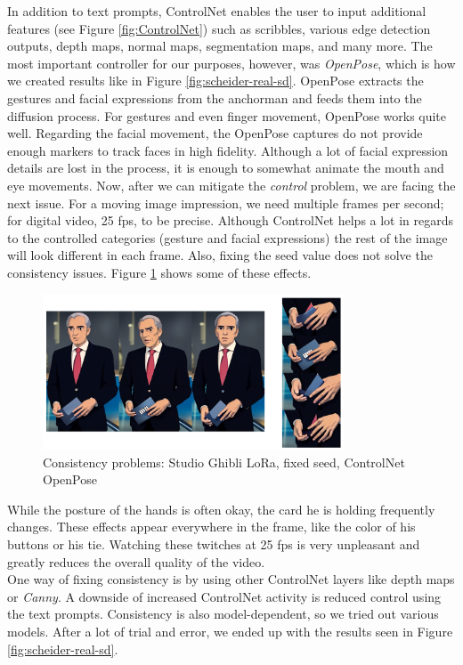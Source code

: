 \documentclass[
  a4paper,  %
  twoside,  %
  bibliography=totoc,
  headsepline,
  cleardoublepage=empty,
  parskip=half,
  draft=false
]{scrbook}
\begin{document}
In addition to text prompts, ControlNet enables the user to input additional features (see Figure \ref{fig:ControlNet}) such as scribbles, various edge detection outputs, depth maps, normal maps, segmentation maps, and many more. The most important controller for our purposes, however, was \textit{OpenPose}, which is how we created results like in Figure \ref{fig:scheider-real-sd}. OpenPose extracts the gestures and facial expressions from the anchorman and feeds them into the diffusion process. For gestures and even finger movement, OpenPose works quite well. Regarding the facial movement, the OpenPose captures do not provide enough markers to track faces in high fidelity. Although a lot of facial expression details are lost in the process, it is enough to somewhat animate the mouth and eye movements.
Now, after we can mitigate the \textit{control} problem, we are facing the next issue. For a moving image impression, we need multiple frames per second; for digital video, 25 \gls{fps}, to be precise. Although ControlNet helps a lot in regards to the controlled categories (gesture and facial expressions) the rest of the image will look different in each frame. Also, fixing the seed value does not solve the consistency issues. Figure \ref{fig:controlnet-issues} shows some of these effects.
\begin{figure}[h]
  \centering
  \includegraphics[width=0.8\textwidth]{./graphics/images/diffusion/ControlNet-issues.png}
  \caption{Consistency problems: Studio Ghibli LoRa, fixed seed, ControlNet OpenPose}
  \label{fig:controlnet-issues}
\end{figure}
While the posture of the hands is often okay, the card he is holding frequently changes. These effects appear everywhere in the frame, like the color of his buttons or his tie. Watching these twitches at 25 \gls{fps} is very unpleasant and greatly reduces the overall quality of the video. \\
One way of fixing consistency is by using other ControlNet layers like depth maps or \textit{Canny}. A downside of increased ControlNet activity is reduced control using the text prompts. Consistency is also model-dependent, so we tried out various models. After a lot of trial and error, we ended up with the results seen in Figure \ref{fig:scheider-real-sd}.
\end{document}
